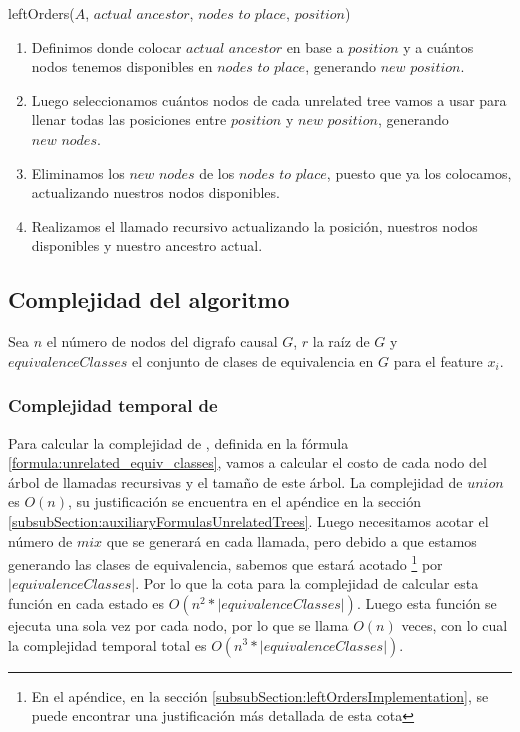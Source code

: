\begin{algorithm}
\caption{leftOrders($A$, $\textit{actual ancestor}$, $\textit{nodes to place}$, $position$)} \label{alg:leftOrdersAlgorithm}
\begin{enumerate}
    \item Definimos donde colocar $\textit{actual ancestor}$ en base a $position$ y a cuántos nodos tenemos disponibles en $\textit{nodes to place}$, generando $\textit{new position}$.
    \item Luego seleccionamos cuántos nodos de cada unrelated tree vamos a usar para llenar todas las posiciones entre $position$ y $\textit{new position}$, generando $\textit{new nodes}$.
    \item Eliminamos los $\textit{new nodes}$ de los $\textit{nodes to place}$, puesto que ya los colocamos, actualizando nuestros nodos disponibles.
    \item Realizamos el llamado recursivo actualizando la posición, nuestros nodos disponibles y nuestro ancestro actual. 
\end{enumerate}
\end{algorithm}

\subsection{Complejidad del algoritmo}
Sea $n$ el número de nodos del digrafo causal $G$, $r$ la raíz de $G$ y $equivalenceClasses$ el conjunto de clases de equivalencia en $G$ para el feature $x_i$.

\subsubsection{Complejidad temporal de \unrEqCl}

Para calcular la complejidad de \unrEqCl, definida en la fórmula \ref{formula:unrelated_equiv_classes}, vamos a calcular el costo de cada nodo del árbol de llamadas recursivas y el tamaño de este árbol. La complejidad de $union$ es $O(n)$, su justificación se encuentra en el apéndice en la sección \ref{subsubSection:auxiliaryFormulasUnrelatedTrees}. Luego necesitamos acotar el número de $mix$ que se generará en cada llamada, pero debido a que estamos generando las clases de equivalencia, sabemos que estará acotado \footnote{En el apéndice, en la sección \ref{subsubSection:leftOrdersImplementation}, se puede encontrar una justificación más detallada de esta cota} por $|equivalenceClasses|$. Por lo que la cota para la complejidad de calcular esta función en cada estado es $O(n^2 * |equivalenceClasses|)$. Luego esta función se ejecuta una sola vez por cada nodo, por lo que se llama $O(n)$ veces, con lo cual la complejidad temporal total es $O(n^3 * |equivalenceClasses|)$.


